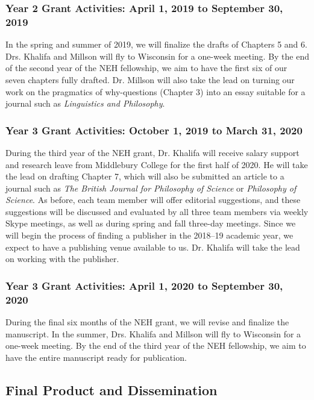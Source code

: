 \documentclass{article}[11pt]
\begin{document}
\subsubsection*{Year 2 Grant Activities: April 1, 2019 to September 30, 2019}

In the spring and summer of 2019, we will finalize the drafts of Chapters 5 and 6.  Drs. Khalifa and Millson will fly to Wisconsin for a one-week meeting. By the end of the second year of the NEH fellowship, we aim to have the first six of our seven chapters fully drafted. Dr. Millson will also take the lead on turning our work on the pragmatics of why-questions (Chapter 3) into an essay suitable for a  journal such as \textit{Linguistics and Philosophy}.

\subsubsection*{Year 3 Grant Activities: October 1, 2019 to March 31, 2020}
During the third year of the NEH grant, Dr. Khalifa will receive salary support and research leave from Middlebury College for the first half of 2020.  He will take the lead on drafting Chapter 7, which will also be submitted an article to a journal such as \textit{The British Journal for Philosophy of Science} or \textit{Philosophy of Science}. As before, each team member will offer editorial suggestions, and these suggestions will be discussed and evaluated by all three team members via weekly Skype meetings, as well as during spring and fall three-day meetings. Since we will begin the process of finding a publisher in the 2018--19 academic year, we expect to have a publishing venue available to us.  Dr. Khalifa will take the lead on working with the publisher.

\subsubsection*{Year 3 Grant Activities: April 1, 2020 to September 30, 2020}

During the final six months of the NEH grant, we will revise and finalize the manuscript.  In the summer, Drs. Khalifa and Millson will fly to Wisconsin for a one-week meeting. By the end of the third year of the NEH fellowship, we aim to have the entire manuscript ready for publication.

\clearpage
{}
\subsection{Final Product and Dissemination}
\label{Final_Product}
\end{document}
